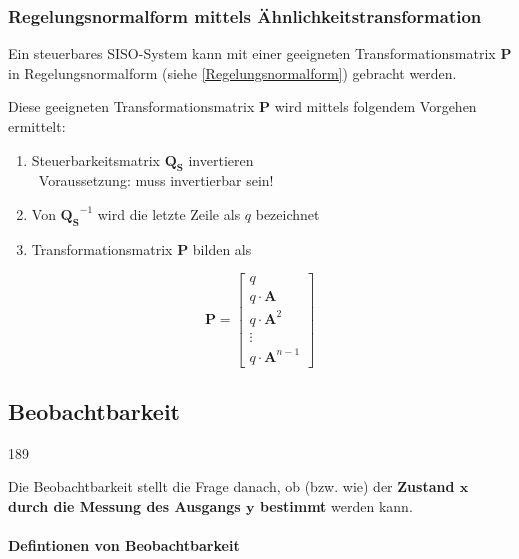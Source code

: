 \subsubsection{Regelungsnormalform mittels Ähnlichkeitstransformation}

Ein steuerbares SISO-System kann mit einer geeigneten Transformationsmatrix $\bm{P}$ in Regelungsnormalform (siehe \ref{Regelungsnormalform}) 
gebracht werden. 


\begin{minipage}[c]{0.78\columnwidth}
    Diese geeigneten Transformationsmatrix $\bm{P}$ wird mittels folgendem Vorgehen ermittelt:

    \smallskip

    \begin{enumerate}
        \item Steuerbarkeitsmatrix $\bm{Q_S}$ invertieren   \\
            \textrightarrow\ Voraussetzung: muss invertierbar sein!
        \item Von $\bm{Q_S}^{-1}$ wird die letzte Zeile als $q$ bezeichnet
        \item Transformationsmatrix $\bm{P}$ bilden als
    \end{enumerate}
\end{minipage}
\hfill
\begin{minipage}[c]{0.2\columnwidth}
    $$
    \bm{P} =
    \begin{bmatrix}
        q                   \\
        q \cdot \bm{A}      \\
        q \cdot \bm{A}^2    \\
        \vdots              \\
        q \cdot \bm{A}^{n-1}
    \end{bmatrix}
    $$
\end{minipage}



\subsection{Beobachtbarkeit}{189}
\label{Beobachtbarkeit}

Die Beobachtbarkeit stellt die Frage danach, ob (bzw. wie) der \textbf{Zustand $\bm{x}$ durch die Messung des Ausgangs $\bm{y}$ bestimmt} werden kann.

\medskip

\paragraph{Defintionen von Beobachtbarkeit}

